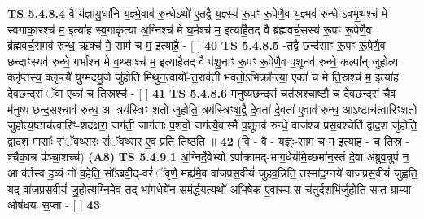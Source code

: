 \documentclass[17pt]{extarticle}
\begin{document}
                  \newline
                                \textbf{ TS 5.4.8.4} \newline
                  वै य॑ज्ञायु॒धा॑नि य॒ज्ञ्मे॒वाव॑ रु॒न्धेऽथो॑ ए॒तद्वै य॒ज्ञ्स्य॑ रू॒पꣳ रू॒पेणै॒व य॒ज्ञ्मव॑ रुन्धे ऽवभृ॒थश्च॑ मे स्वगाका॒रश्च॑ म॒ इत्या॑ह स्व॒गाकृ॑त्या अ॒ग्निश्च॑ मे घ॒र्मश्च॑ म॒ इत्या॑है॒तद् वै ब्र॑ह्मवर्च॒सस्य॑ रू॒पꣳ रू॒पेणै॒व ब्र॑ह्मवर्च॒समव॑ रुन्ध॒ ऋक्च॑ मे॒ साम॑ च म॒ इत्या॑है॒ - [  ] \textbf{  40} \newline
                  \newline
                                \textbf{ TS 5.4.8.5} \newline
                  -तद्वै छन्द॑साꣳ रू॒पꣳ रू॒पेणै॒व छन्दाꣳ॒॒स्यव॑ रुन्धे॒ गर्भा᳚श्च मे व॒थ्साश्च॑ म॒ इत्या॑है॒तद् वै प॑शू॒नाꣳ रू॒पꣳ रू॒पेणै॒व प॒शूनव॑ रुन्धे॒ कल्पा᳚न् जुहो॒त्य क्लृ॑प्तस्य॒ क्लृप्त्यै॑ युग्मदयु॒जे जु॑होति मिथुन॒त्वायो᳚-त्त॒राव॑ती भवतो॒ऽभिक्रा᳚न्त्या॒ एका॑ च मे ति॒स्रश्च॑ म॒ इत्या॑ह देवछन्द॒सं ॅवा एका॑ च ति॒स्रश्च॑ - [  ] \textbf{  41} \newline
                  \newline
                                \textbf{ TS 5.4.8.6} \newline
                  मनुष्यछन्द॒सं चत॑स्रश्चा॒ष्टौ च॑ देवछन्द॒सं चै॒व म॑नुष्य छन्द॒सश्चाव॑ रुन्ध॒ आ त्रय॑स्त्रिꣳ शतो जुहोति॒ त्रय॑स्त्रिꣳश॒द्वै दे॒वता॑ दे॒वता॑ ए॒वाव॑ रुन्ध॒ आऽष्टाच॑त्वारिꣳशतो जुहोत्य॒ष्टाच॑त्वारिꣳ-शदक्षरा॒ जग॑ती॒ जाग॑ताः प॒शवो॒ जग॑त्यै॒वास्मै॑ प॒शूनव॑ रुन्धे॒ वाज॑श्च प्रस॒वश्चेति॑ द्वाद॒शं जु॑होति॒ द्वाद॑श॒ मासाः᳚ संॅवथ्स॒रः सं॑ॅवथ्स॒र ए॒व प्रति॑ तिष्ठति ॥ \textbf{  42} \newline
                  \newline
                      (वि - वै - य॒ज्ञ्ः-साम॑ च म॒ इत्या॑ह - च ति॒स्र - श्चैका॒न्न प॑ञ्चा॒शच्च॑)  \textbf{(A8)} \newline \newline
                                        \textbf{ TS 5.4.9.1} \newline
                  अ॒ग्निर्दे॒वेभ्यो ऽपा᳚क्रामद्-भाग॒धेय॑मि॒च्छमा॑न॒स्तं दे॒वा अ॑ब्रुव॒न्नुप॑ न॒ आ व॑र्तस्व ह॒व्यं नो॑ व॒हेति॒ सो᳚ऽब्रवी॒द्-वरं॑ ॅवृणै॒ मह्य॑मे॒व वा॑जप्रस॒वीयं॑ जुहव॒न्निति॒ तस्मा॑द॒ग्नये॑ वाजप्रस॒वीयं॑ जुह्वति॒ यद्-वा॑जप्रस॒वीयं॑ जु॒होत्य॒ग्निमे॒व तद्-भा॑ग॒धेये॑न॒ सम॑र्द्धय॒त्यथो॑ अभिषे॒क ए॒वास्य॒ स च॑तुर्द॒शभि॑र्जुहोति स॒प्त ग्रा॒म्या ओष॑धयः स॒प्ता - [  ] \textbf{  43} \newline
                  \newline
\end{document}
